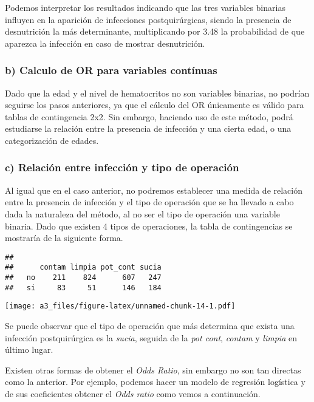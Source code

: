 \documentclass[]{article}
\begin{document}
Podemos interpretar los resultados indicando que las tres variables
binarias influyen en la aparición de infecciones postquirúrgicas, siendo
la presencia de desnutrición la más determinante, multiplicando por 3.48
la probabilidad de que aparezca la infección en caso de mostrar
desnutrición.

\hypertarget{b-calculo-de-or-para-variables-contuxednuas}{%
\subsubsection{b) Calculo de OR para variables
contínuas}\label{b-calculo-de-or-para-variables-contuxednuas}}

Dado que la edad y el nivel de hematocritos no son variables binarias,
no podrían seguirse los pasos anteriores, ya que el cálculo del OR
únicamente es válido para tablas de contingencia 2x2. Sin embargo,
haciendo uso de este método, podrá estudiarse la relación entre la
presencia de infección y una cierta edad, o una categorización de
edades.

\hypertarget{c-relaciuxf3n-entre-infecciuxf3n-y-tipo-de-operaciuxf3n}{%
\subsubsection{c) Relación entre infección y tipo de
operación}\label{c-relaciuxf3n-entre-infecciuxf3n-y-tipo-de-operaciuxf3n}}

Al igual que en el caso anterior, no podremos establecer una medida de
relación entre la presencia de infección y el tipo de operación que se
ha llevado a cabo dada la naturaleza del método, al no ser el tipo de
operación una variable binaria. Dado que existen 4 tipos de operaciones,
la tabla de contingencias se mostraría de la siguiente forma.

\begin{verbatim}
##     
##      contam limpia pot_cont sucia
##   no    211    824      607   247
##   si     83     51      146   184
\end{verbatim}

\texttt{[image: a3\_files/figure-latex/unnamed-chunk-14-1.pdf]}

Se puede observar que el tipo de operación que más determina que exista
una infección postquirúrgica es la \emph{sucia}, seguida de la \emph{pot
cont}, \emph{contam} y \emph{limpia} en último lugar.

Existen otras formas de obtener el \emph{Odds Ratio}, sin embargo no son
tan directas como la anterior. Por ejemplo, podemos hacer un modelo de
regresión logística y de sus coeficientes obtener el \emph{Odds ratio}
como vemos a continuación.
\end{document}
